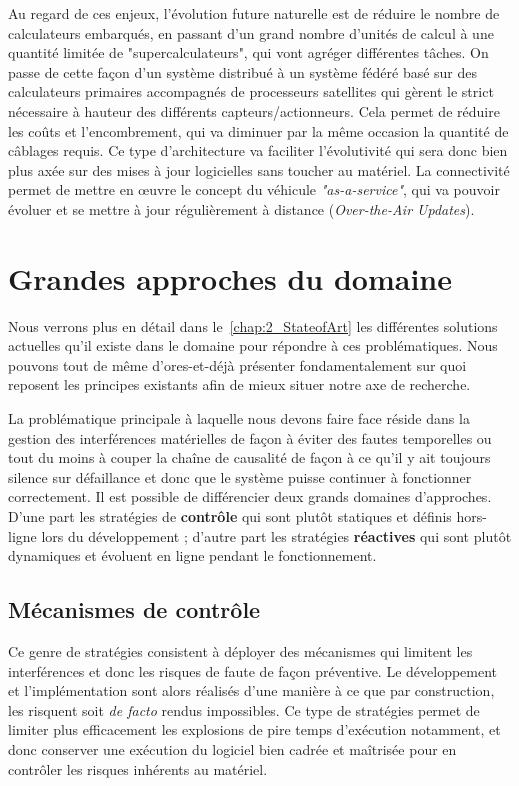 \documentclass[french, a4paper, 11pt, twoside, pdftex]{StyleThese}
\begin{document}
	Au regard de ces enjeux, l'évolution future naturelle est de réduire le nombre de calculateurs embarqués, en passant d'un grand nombre d'unités de calcul à une quantité limitée de "supercalculateurs", qui vont agréger différentes tâches. On passe de cette façon d'un système distribué à un système fédéré basé sur des calculateurs primaires accompagnés de processeurs satellites qui gèrent le strict nécessaire à hauteur des différents capteurs/actionneurs.  Cela permet de réduire les coûts et l'encombrement, qui va diminuer par la même occasion la quantité de câblages requis. Ce type d'architecture va faciliter l'évolutivité qui sera donc bien plus axée sur des mises à jour logicielles sans toucher au matériel. La connectivité permet de mettre en œuvre le concept du véhicule \textit{"as-a-service"}, qui va pouvoir évoluer et se mettre à jour régulièrement à distance (\textit{Over-the-Air Updates}). 
	
	
\section{Grandes approches du domaine}

	Nous verrons plus en détail dans le~\autoref{chap:2_StateofArt} les différentes solutions actuelles qu'il existe dans le domaine pour répondre à ces problématiques. Nous pouvons tout de même d'ores-et-déjà présenter fondamentalement sur quoi reposent les principes existants afin de mieux situer notre axe de recherche.
	
	La problématique principale à laquelle nous devons faire face réside dans la gestion des interférences matérielles de façon à éviter des fautes temporelles ou tout du moins à couper la chaîne de causalité de façon à ce qu'il y ait toujours silence sur défaillance et donc que le système puisse continuer à fonctionner correctement. Il est possible de différencier deux grands domaines d'approches. D'une part les stratégies de \textbf{contrôle} qui sont plutôt statiques et définis hors-ligne lors du développement ; d'autre part les stratégies \textbf{réactives} qui sont plutôt dynamiques et évoluent en ligne pendant le fonctionnement.
	
	\subsection{Mécanismes de contrôle}
		Ce genre de stratégies consistent à déployer des mécanismes qui limitent les interférences et donc les risques de faute de façon préventive. Le développement et l'implémentation sont alors réalisés d'une manière à ce que par construction, les risquent soit \textit{de facto} rendus impossibles.
		Ce type de stratégies permet de limiter plus efficacement les explosions de pire temps d'exécution notamment, et donc conserver une exécution du logiciel bien cadrée et maîtrisée pour en contrôler les risques inhérents au matériel. 
		
\end{document}
